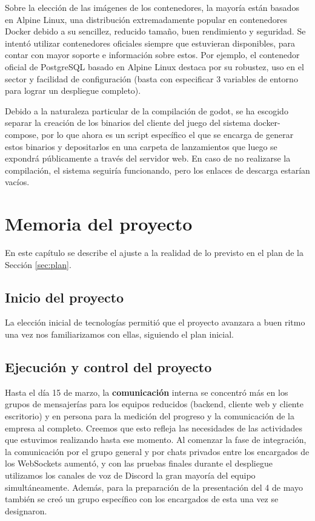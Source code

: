 \documentclass[11pt]{article}
\begin{document}
Sobre la elección de las imágenes de los contenedores, la mayoría están
basados en Alpine Linux, una distribución extremadamente
popular en contenedores Docker debido a su sencillez, reducido tamaño, buen
rendimiento y seguridad. Se intentó utilizar contenedores oficiales
siempre que estuvieran disponibles, para contar con mayor soporte e 
información sobre estos. Por ejemplo, el contenedor oficial de PostgreSQL
basado en Alpine Linux destaca por su robustez, uso en el sector y facilidad de
configuración (basta con especificar 3 variables de entorno para
lograr un despliegue completo).

Debido a la naturaleza particular de la compilación de godot, se ha escogido
separar la creación de los binarios del cliente del juego del sistema
docker-compose, por lo que ahora es un script específico el que se encarga de
generar estos binarios y depositarlos en una carpeta de lanzamientos que luego
se expondrá públicamente a través del servidor web. En caso de no realizarse la
compilación, el sistema seguiría funcionando, pero los enlaces de descarga
estarían vacíos.

\newpage
\section{Memoria del proyecto} 
\label{sec:memoria}
En este capítulo se describe el ajuste a la realidad de lo previsto en
el plan de la Sección \ref{sec:plan}.
\subsection{Inicio del proyecto} %
La elección inicial de tecnologías permitió que el proyecto avanzara a buen
ritmo una vez nos familiarizamos con ellas, siguiendo el plan inicial. 

\subsection{Ejecución y control del proyecto} %
\label{ss:mem323}
Hasta el día 15 de marzo, la \textbf{comunicación} interna se concentró más
en los grupos de mensajerías para los equipos reducidos (backend,
cliente web y cliente escritorio) y en persona para la medición del
progreso y la comunicación de la empresa al completo. Creemos que
esto refleja las necesidades de las actividades que estuvimos
realizando hasta ese momento.
Al comenzar la fase de integración, la comunicación por el grupo
general y por chats privados entre los encargados de los WebSockets
aumentó, y con las pruebas finales durante el despliegue utilizamos
los canales de voz de Discord la gran mayoría del equipo simultáneamente.
Además, para la preparación de la presentación del 4 de mayo también se
creó un grupo específico con los encargados de esta una vez se designaron.
\end{document}
